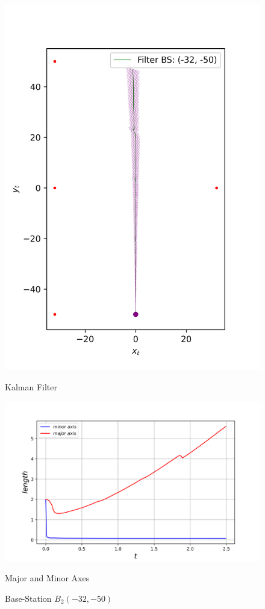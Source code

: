 \begin{figure}[H]
\begin{minipage}{0.49\linewidth}
        \includegraphics[width=\linewidth]{plots/part2-f-1-filter.png}
        \caption*{Kalman Filter}
    \end{minipage}
    \vspace{-0.1cm}
    \begin{minipage}{\linewidth}
        \centering
        \includegraphics[width=\linewidth]{plots/part2-f-1-axes.png}
        \caption*{Major and Minor Axes}
    \end{minipage}

    \caption{Base-Station $B_2(-32, -50)$}
\end{figure}


